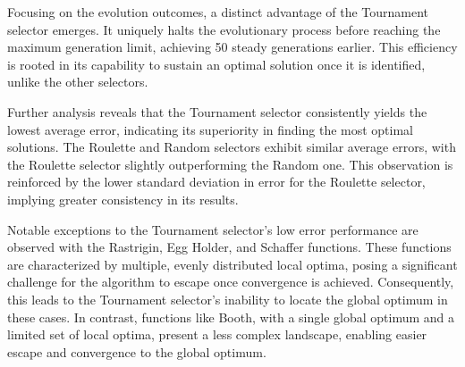     Focusing on the evolution outcomes, a distinct advantage of the Tournament selector emerges. It uniquely halts the 
    evolutionary process before reaching the maximum generation limit, achieving 50 steady generations earlier. This 
    efficiency is rooted in its capability to sustain an optimal solution once it is identified, unlike the other 
    selectors.

    Further analysis reveals that the Tournament selector consistently yields the lowest average error, indicating its 
    superiority in finding the most optimal solutions. The Roulette and Random selectors exhibit similar average errors, 
    with the Roulette selector slightly outperforming the Random one. This observation is reinforced by the lower 
    standard deviation in error for the Roulette selector, implying greater consistency in its results.

    Notable exceptions to the Tournament selector's low error performance are observed with the Rastrigin, Egg Holder, 
    and Schaffer functions. These functions are characterized by multiple, evenly distributed local optima, posing a 
    significant challenge for the algorithm to escape once convergence is achieved. Consequently, this leads to the 
    Tournament selector's inability to locate the global optimum in these cases. In contrast, functions like Booth, with 
    a single global optimum and a limited set of local optima, present a less complex landscape, enabling easier escape 
    and convergence to the global optimum.
